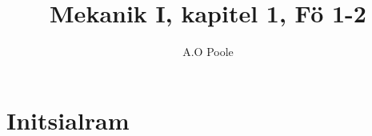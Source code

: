 \documentclass[a4paper,12pt]{article}
\title{Mekanik I, kapitel 1, Fö 1-2}
\author{A.O Poole}
\begin{document}
\section{Initsialram}
\end{document}
